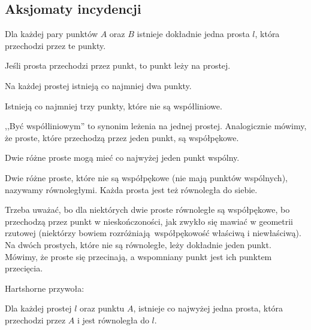 %

\subsection{Aksjomaty incydencji}
\begin{axiom}[incydencji, I1]
    Dla każdej pary punktów $A$ oraz $B$ istnieje dokładnie jedna prosta $l$, która przechodzi przez te punkty.
\end{axiom}

Jeśli prosta przechodzi przez punkt, to punkt leży na prostej.

\begin{axiom}[incydencji, I2]
    Na każdej prostej istnieją co najmniej dwa punkty.
\end{axiom}

\begin{axiom}[incydencji, I3]
    Istnieją co najmniej trzy punkty, które nie są współliniowe.
\end{axiom}

,,Być współliniowym'' to synonim leżenia na jednej prostej.
%
Analogicznie mówimy, że proste, które przechodzą przez jeden punkt, są współpękowe.

\begin{proposition}
    Dwie różne proste mogą mieć co najwyżej jeden punkt wspólny.
\end{proposition}

\begin{definition}
    Dwie różne proste, które nie są współpękowe (nie mają punktów wspólnych), nazywamy równoległymi.
    Każda prosta jest też równoległa do siebie.
\end{definition}
%

Trzeba uważać, bo dla niektórych dwie proste równoległe są współpękowe, bo przechodzą przez punkt w nieskończoności, jak zwykło się mawiać w geometrii rzutowej (niektórzy bowiem rozróżniają współpękowość właściwą i niewłaściwą).
Na dwóch prostych, które nie są równoległe, leży dokładnie jeden punkt.
Mówimy, że proste się przecinają, a wspomniany punkt jest ich punktem przecięcia.

Hartshorne \cite[s. 38]{hartshorne2000} przywoła:

\begin{axiom}[Playfaira, P]
    Dla każdej prostej $l$ oraz punktu $A$, istnieje co najwyżej jedna prosta, która przechodzi przez $A$ i jest równoległa do $l$.
\end{axiom}
%


